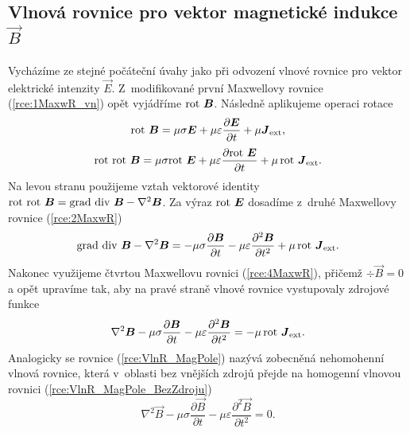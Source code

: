 \subsection{Vlnová rovnice pro vektor magnetické indukce $\vec B$}
Vycházíme ze stejné počáteční úvahy jako při odvození vlnové rovnice pro vektor elektrické intenzity $\vec E$. Z~modifikované první Maxwellovy rovnice (\ref{rce:1MaxwR_vn}) opět vyjádříme $\mathrm{rot}\  \mbox{\boldmath$B$}$. Následně aplikujeme operaci rotace
\begin{displaymath}
	\mathrm{rot}\ \mbox{\boldmath$B$} = \mu\sigma\mbox{\boldmath$E$}+\mu\varepsilon\frac{\partial\mbox{\boldmath$E$}}{\partial t}+\mu\mbox{\boldmath$J$}_{\mathrm{ext}},
\end{displaymath}
\begin{displaymath}
	\mathrm{rot}\ \mathrm{rot}\ \mbox{\boldmath$B$} = \mu\sigma\mathrm{rot}\ \mbox{\boldmath$E$}+\mu\varepsilon\frac{\partial \mathrm{rot}\ \mbox{\boldmath$E$}}{\partial t}+\mu\,\mathrm{rot}\ \mbox{\boldmath$J$}_{\mathrm{ext}}.
\end{displaymath}
Na levou stranu použijeme vztah vektorové identity $\mathrm{rot}\ \mathrm{rot}\ \mbox{\boldmath$B$} = \mathrm{grad}\ \mathrm{div}\ \mbox{\boldmath$B$} - \nabla^{2}\mbox{\boldmath$B$}$. Za výraz $\mathrm{rot}\  \mbox{\boldmath$E$}$ dosadíme z~druhé Maxwellovy rovnice (\ref{rce:2MaxwR}) 
\begin{displaymath}
	\mathrm{grad}\ \mathrm{div}\ \mbox{\boldmath$B$} - \nabla^{2}\mbox{\boldmath$B$} = -\mu\sigma\frac{\partial\mbox{\boldmath$B$}}{\partial t}-\mu\varepsilon\frac{\partial^{2}\mbox{\boldmath$B$}}{\partial t^{2}}+\mu\,\mathrm{rot}\ \mbox{\boldmath$J$}_{\mathrm{ext}}.
\end{displaymath}
Nakonec využijeme čtvrtou Maxwellovu rovnici (\ref{rce:4MaxwR}), přičemž $\div \vec B = 0$ a opět upravíme tak, aby na pravé straně vlnové rovnice vystupovaly zdrojové funkce
\begin{equation}
	\nabla^{2}\mbox{\boldmath$B$} -\mu\sigma\frac{\partial\mbox{\boldmath$B$}}{\partial t}-\mu\varepsilon\frac{\partial^{2}\mbox{\boldmath$B$}}{\partial t^{2}}= -\mu\,\mathrm{rot}\ \mbox{\boldmath$J$}_{\mathrm{ext}}.
	\label{rce:VlnR_MagPole}
\end{equation}
Analogicky se rovnice (\ref{rce:VlnR_MagPole}) nazývá zobecněná nehomohenní vlnová rovnice, která v~oblasti bez vnějších zdrojů přejde na homogenní vlnovou rovnici (\ref{rce:VlnR_MagPole_BezZdroju})
\begin{equation}
	\nabla^{2}\vec B -\mu\sigma\frac{\partial\vec B}{\partial t}-\mu\varepsilon\frac{\partial^{2}\vec B}{\partial t^{2}}= 0.
	\label{rce:VlnR_MagPole_BezZdroju}
\end{equation}


